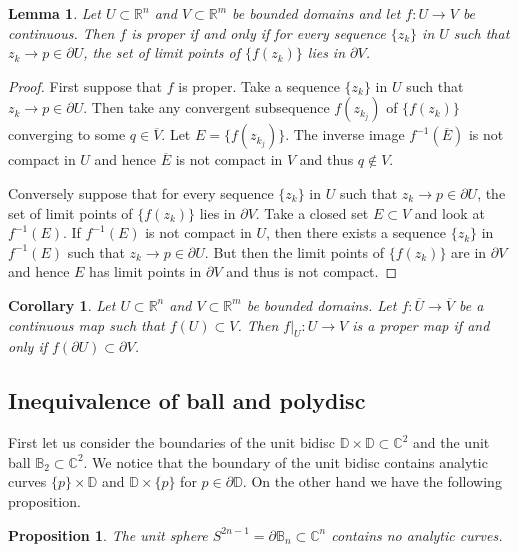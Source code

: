 \documentclass[12pt,openany]{book}
\newcommand{\C}{{\mathbb{C}}}
\newcommand{\R}{{\mathbb{R}}}
\newcommand{\bB}{{\mathbb{B}}}
\newcommand{\bD}{{\mathbb{D}}}
\theoremstyle{plain}
\newtheorem{lemma}[thm]{Lemma}
\newtheorem{prop}[thm]{Proposition}
\newtheorem{cor}[thm]{Corollary}
\theoremstyle{remark}
\theoremstyle{definition}
\theoremstyle{exercise}
\theoremstyle{example}
\begin{document}
\begin{lemma} \label{lemma:bndrytobndry}
Let $U \subset \R^n$ and $V \subset \R^m$ be bounded domains and
let $f \colon U \to V$ be continuous.
Then $f$ is proper if and only if
for every sequence $\{ z_k \}$ in $U$ such that $z_k \to p \in \partial U$,
the set of limit points of $\{ f(z_k) \}$ lies in $\partial V$.
\end{lemma}

\begin{proof}
First suppose that $f$ is proper.  Take a 
sequence $\{ z_k \}$ in $U$ such that $z_k \to p \in \partial U$.
Then take any convergent subsequence $f(z_{k_j})$ of $\{ f(z_k) \}$
converging to some $q \in \overline{V}$.  Let
$E = \{ f(z_{k_j}) \}$.  The inverse image $f^{-1}(\overline{E})$
is not compact in $U$ and hence $\overline{E}$ is not
compact in $V$ and thus $q \notin V$.

Conversely suppose that for every sequence
$\{ z_k \}$ in $U$ such that $z_k \to p \in \partial U$,
the set of limit points of $\{ f(z_k) \}$ lies in $\partial V$.
Take a closed set $E \subset V$ and look at $f^{-1}(E)$.  If $f^{-1}(E)$
is not compact in $U$, then there exists a sequence $\{ z_k \}$ in $f^{-1}(E)$
such that $z_k \to p \in \partial U$.  But then the limit points of
$\{ f(z_k) \}$ are in $\partial V$ and hence $E$ has limit points in
$\partial V$ and thus is not compact.
\end{proof}

\begin{cor}
Let $U \subset \R^n$ and $V \subset \R^m$ be bounded domains.
Let $f \colon \overline{U} \to \overline{V}$ be a continuous map
such that $f(U) \subset V$.
Then
$f|_U \colon U \to V$ is a proper map if and only if
$f(\partial U) \subset \partial V$.
\end{cor}

\subsection{Inequivalence of ball and polydisc}

First let us consider the boundaries of 
the unit bidisc $\bD \times \bD \subset \C^2$
and the unit ball $\bB_2 \subset \C^2$.  We notice that the boundary
of the unit bidisc contains analytic curves $\{p\} \times \bD$
and $\bD \times \{p\}$ for $p \in \partial \bD$.  On the other hand
we have the following proposition.

\begin{prop}
The unit sphere $S^{2n-1} = \partial \bB_n \subset \C^n$ 
contains no analytic curves.
\end{prop}
\end{document}
